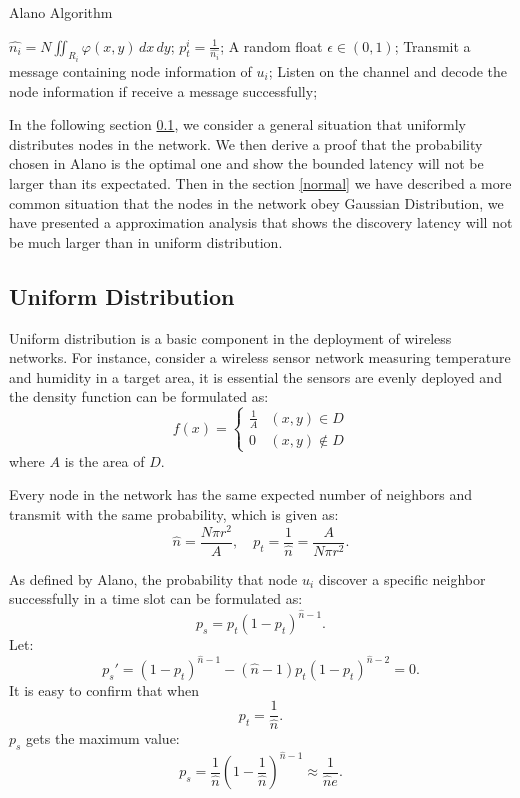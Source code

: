 \begin{algorithm}
\caption{Alano Algorithm}
\label{Alano}
\begin{algorithmic}[1]
\STATE $\hat{n_i} = N\iint_{R_i} \varphi(x,y)\,dx\,dy$;
\STATE $p_t^i = \frac{1}{\hat{n_i}}$;
	\STATE A random float $\epsilon \in (0,1)$;
    		\STATE Transmit a message containing node information of $u_i$;
	\ELSE
    		\STATE Listen on the channel and decode the node information if receive a message successfully;
	\ENDIF
\ENDWHILE
\end{algorithmic}
\end{algorithm}

In the following section \ref{uniform}, we consider a general situation that uniformly distributes nodes
in the network. We then derive a proof that the probability
chosen in Alano is the optimal one and show the bounded latency will not 
be larger than its expectated. Then in the section  \ref{normal} we have described a more
common situation that the nodes in the network obey Gaussian Distribution, we have presented a 
approximation analysis that shows the discovery latency will not be much larger than in uniform distribution.


\subsection{Uniform Distribution}
\label{uniform}
Uniform distribution is a basic component in the deployment of wireless networks. 
For instance, consider a  wireless sensor network
measuring temperature and humidity in a target area, 
it is essential the sensors are evenly deployed and the density function can be 
formulated as:
$$f(x)=
\begin{cases}
\frac{1}{A}& (x,y)\in D\\
0& (x,y)\notin D
\end{cases}$$
where $A$ is the area of $D$.

Every node in the network has the same expected number of 
neighbors and transmit with the same probability, which is given as:
$$
\hat{n} = \frac{N\pi r^2}{A}, \quad p_t = \frac{1}{\hat{n}}=\frac{A}{N\pi r^2}.
$$  

As defined by Alano, the probability that node $u_i$ discover a specific
neighbor successfully in a time slot can be formulated as:
$$
p_s = p_t{(1-p_t)}^{\hat{n}-1}.
$$
Let:
$$
p_s' = {(1-p_t)}^{\hat{n}-1}-(\hat{n}-1)p_t{(1-p_t)}^{\hat{n}-2}=0.
$$
It is easy to confirm that when
$$p_t=\frac{1}{\hat{n}}.$$ 
$p_s$ gets the maximum value:
$$p_s = \frac{1}{\hat{n}}{(1-\frac{1}{\hat{n}})}^{\hat{n}-1} \approx \frac{1}{\hat{n}e}.$$

